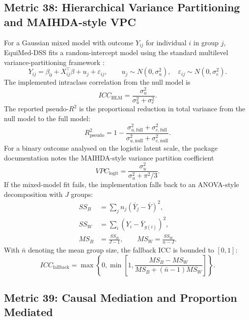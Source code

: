 \documentclass[11pt]{article}
\begin{document}
\subsection{Metric 38: Hierarchical Variance Partitioning and MAIHDA-style VPC}

For a Gaussian mixed model with outcome $Y_{ij}$ for individual $i$ in group $j$,
EquiMed-DSS fits a random-intercept model using the standard multilevel
variance-partitioning framework \cite{raudenbush2002}:
\begin{equation}
Y_{ij}=\beta_0+X_{ij}^{\top}\beta+u_j+\varepsilon_{ij},
\qquad
u_j\sim N(0,\sigma_u^2),\quad
\varepsilon_{ij}\sim N(0,\sigma_e^2).
\end{equation}
The implemented intraclass correlation from the null model is
\begin{equation}
ICC_{\mathrm{HLM}}=
\frac{\sigma_u^2}{\sigma_u^2+\sigma_e^2}.
\end{equation}
The reported pseudo-$R^2$ is the proportional reduction in total variance from
the null model to the full model:
\begin{equation}
R^2_{\mathrm{pseudo}}=
1-\frac{\sigma_{u,\mathrm{full}}^2+\sigma_{e,\mathrm{full}}^2}
{\sigma_{u,\mathrm{null}}^2+\sigma_{e,\mathrm{null}}^2}.
\end{equation}
For a binary outcome analysed on the logistic latent scale, the package
documentation notes the MAIHDA-style variance partition coefficient
\begin{equation}
VPC_{\mathrm{logit}}=
\frac{\sigma_u^2}{\sigma_u^2+\pi^2/3}.
\end{equation}
If the mixed-model fit fails, the implementation falls back to an ANOVA-style
decomposition with $J$ groups:
\begin{align}
SS_B &= \sum_j n_j(\bar Y_j-\bar Y)^2,\\
SS_W &= \sum_i (Y_i-\bar Y_{g(i)})^2,\\
MS_B &= \frac{SS_B}{J-1},\qquad
MS_W = \frac{SS_W}{n-J}.
\end{align}
With $\bar n$ denoting the mean group size, the fallback ICC is bounded to
$[0,1]$:
\begin{equation}
ICC_{\mathrm{fallback}}=
\max\left\{0,\min\left[1,
\frac{MS_B-MS_W}{MS_B+(\bar n-1)MS_W}
\right]\right\}.
\end{equation}

\subsection{Metric 39: Causal Mediation and Proportion Mediated}
\end{document}
